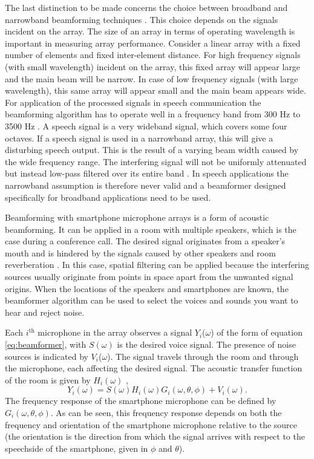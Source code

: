The last distinction to be made concerns the choice between broadband and narrowband beamforming techniques \cite{brandstein2001}. This choice depends on the signals incident on the array. The size of an array in terms of operating wavelength is important in measuring array performance. Consider a linear array with a fixed number of elements and fixed inter-element distance. For high frequency signals (with small wavelength) incident on the array, this fixed array will appear large and the main beam will be narrow. In case of low frequency signals (with large wavelength), this same array will appear small and the main beam appears wide. 
For application of the processed signals in speech communication the beamforming algorithm has to operate well in a frequency band from 300 Hz to 3500 Hz \cite{doclo2003design}.
A speech signal is a very wideband signal, which covers some four octaves. If a speech signal is used in a narrowband array, this will give a disturbing speech output. This is the result of a varying beam width caused by the wide frequency range. The interfering signal will not be uniformly attenuated but instead low-pass filtered over its entire band \cite{brandstein2001}. 
In speech applications the narrowband assumption is therefore never valid and a beamformer designed specifically for broadband applications need to be used. 

Beamforming with smartphone microphone arrays is a form of acoustic beamforming. It can be applied in a room with multiple speakers, which is the case during a conference call.
The desired signal originates from a speaker's mouth and is hindered by the signals caused by other speakers and room reverberation \cite{brandstein2001}.
In this case, spatial filtering can be applied because the interfering sources usually originate from points in space apart from the unwanted signal origins.
When the locations of the speakers and smartphones are known, the beamformer algorithm can be used to select the voices and sounds you want to hear and reject noise.

Each $i^\text{th}$ microphone in the array observes a signal $Y_{i}$($\omega$) of the form of equation \eqref{eq:beamformer}, with $S(\omega)$ is the desired voice signal. 
The presence of noise sources is indicated by $V_{i}$($\omega$).
The signal travels through the room and through the microphone, each affecting the desired signal. 
The acoustic transfer function of the room is given by $H_{i}(\omega)$ 
\cite{Gaubitch2014},
\begin{equation}
\label{eq:beamformer}
Y_{i}(\omega) = S(\omega) H_{i}(\omega) G_{i} (\omega,\theta,\phi) + V_{i}(\omega).
\end{equation}
The frequency response of the smartphone microphone can be defined by $G_i(\omega,\theta,\phi)$.
As can be seen, this frequency response depends on both the frequency and orientation of the smartphone microphone relative to the source (the orientation is the direction from which the signal arrives with respect to the speechside of the smartphone, given in $\phi$ and $\theta$).

